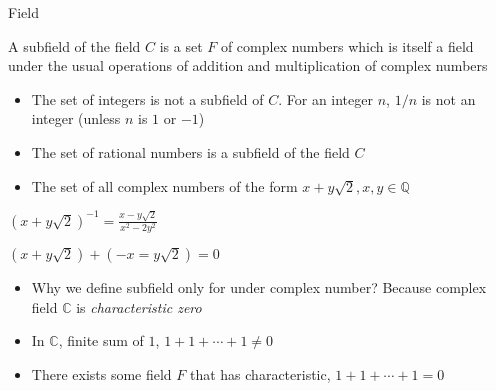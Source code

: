 \documentclass[8pt]{beamer}
\newcommand{\mbb}[1]{\mathbb{#1}}
\newcommand{\ti}[1]{\textit{#1}}
\begin{document}
\begin{frame}{Field}
  \begin{definition}[Subfield]
    A subfield of the field $C$ is a set $F$ of complex numbers which is itself a field under the usual operations of addition and multiplication of complex numbers
  \end{definition}

  \begin{example}
    \begin{itemize}
      \item The set of integers is not a subfield of $C$. For an integer $n$, $1/n$ is not an integer (unless $n$ is $1$ or $-1$)
      \item The set of rational numbers is a subfield of the field $C$
      \item The set of all complex numbers of the form $x + y \sqrt{2}, x, y \in \mbb{Q}$
    \end{itemize}
  \end{example}

  $(x + y \sqrt{2})^{-1} = \frac{x - y \sqrt{2}}{x^2 - 2 y^2}$

  $(x + y \sqrt{2}) + (- x = y \sqrt{2}) = 0$

  \begin{itemize}
    \item Why we define subfield only for under complex number? Because complex field $\mbb{C}$ is \ti{characteristic zero}
    \item In $\mbb{C}$, finite sum of $1$, $1 + 1 + \cdots + 1 \neq 0$
    \item There exists some field $F$ that has characteristic, $1 + 1+ \cdots + 1 = 0$
  \end{itemize}
\end{frame}
\end{document}
